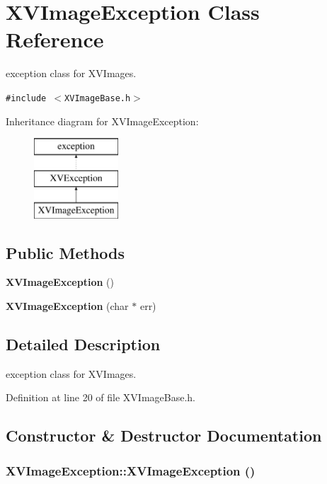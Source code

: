 \hypertarget{class_XVImageException}{
\section{XVImage\-Exception  Class Reference}
\label{XVImageException}
}
exception class for XVImages. 


{\tt \#include $<$XVImage\-Base.h$>$}

Inheritance diagram for XVImage\-Exception:\begin{figure}[H]
\begin{center}
\leavevmode
\includegraphics[height=3cm]{class_XVImageException}
\end{center}
\end{figure}
\subsection*{Public Methods}
\begin{CompactItemize}
\item 
{\bf XVImage\-Exception} ()
\item 
{\bf XVImage\-Exception} (char $\ast$ err)
\end{CompactItemize}


\subsection{Detailed Description}
exception class for XVImages.





Definition at line 20 of file XVImage\-Base.h.

\subsection{Constructor \& Destructor Documentation}
\label{XVImageException_a0}
\hypertarget{class_XVImageException_a0}{
\subsubsection[XVImageException]{\setlength{\rightskip}{0pt plus 5cm}XVImage\-Exception::XVImage\-Exception ()}}




